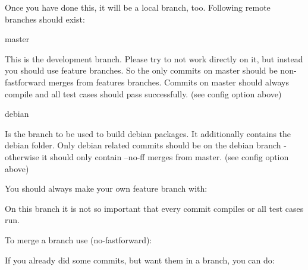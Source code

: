 Once you have done this, it will be a local branch, too. Following remote branches should exist\+: \begin{DoxyVerb}master
\end{DoxyVerb}


This is the development branch. Please try to not work directly on it, but instead you should use feature branches. So the only commits on master should be non-\/fastforward merges from features branches. Commits on master should always compile and all test cases should pass successfully. (see config option above) \begin{DoxyVerb}debian
\end{DoxyVerb}


Is the branch to be used to build debian packages. It additionally contains the debian folder. Only debian related commits should be on the debian branch -\/ otherwise it should only contain --no-\/ff merges from master. (see config option above)

You should always make your own feature branch with\+:


\begin{DoxyCode}{0}
\end{DoxyCode}


On this branch it is not so important that every commit compiles or all test cases run.

To merge a branch use (no-\/fastforward)\+:


\begin{DoxyCode}{0}
\end{DoxyCode}


If you already did some commits, but want them in a branch, you can do\+:


\begin{DoxyCode}{0}
\DoxyCodeLine{}
\end{DoxyCode}
 